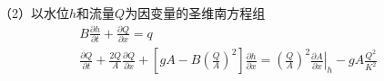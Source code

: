                                                           （2）以水位$h$和流量$Q$为因变量的圣维南方程组
                                                          \begin{equation}
                                                            \begin{gathered}
                                                              B\frac{\partial h}{\partial t}
                                                              +
                                                              \frac{\partial Q}{\partial x}
                                                              =
                                                              q
                                                              \\
                                                              \frac{\partial Q}{\partial t}
                                                              +
                                                              \frac{2Q}{A}\frac{\partial Q}{\partial x}
                                                              +
                                                              \left[
                                                                gA -
                                                                B
                                                                \left(
                                                                  \frac{Q}{A}
                                                                \right)^{2}
                                                              \right]
                                                              \frac{\partial h}{\partial x}
                                                              =
                                                              \left(
                                                                \frac{Q}{A}
                                                              \right)^{2}
                                                              \left.
                                                                \frac{\partial A}{\partial x}
                                                                \right|_{h}
                                                                -
                                                                gA\frac{Q^{2}}{K^{2}}
                                                              \end{gathered}
                                                              \label{EqCGe_SV_hQ}
                                                            \end{equation}



